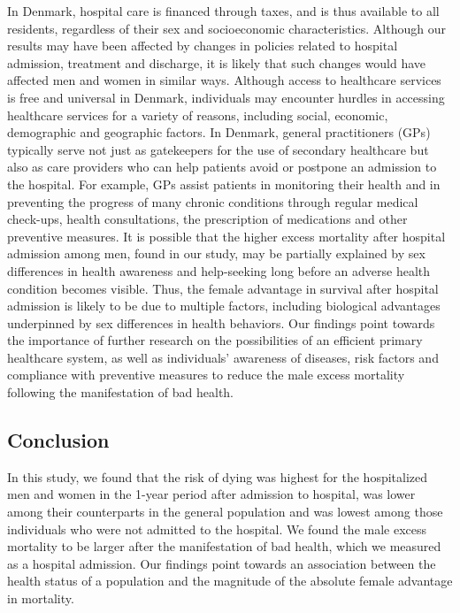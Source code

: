 In Denmark, hospital care is financed through taxes, and is thus available 
to all residents, regardless of their sex and socioeconomic characteristics.\citep{olesen2009delay} 
Although our results may have been affected by changes in policies related 
to hospital admission, treatment and discharge, it is likely that such 
changes would have affected men and women in similar ways. Although access 
to healthcare services is free and universal in Denmark, individuals may 
encounter hurdles in accessing healthcare services for a variety of reasons, 
including social, economic, demographic and geographic factors.\citep{starfield2012clinical} 
In Denmark, general practitioners (GPs) typically serve not just as 
gatekeepers for the use of secondary healthcare but also as care providers 
who can help patients avoid or postpone an admission to the hospital. For 
example, GPs assist patients in monitoring their health and in preventing 
the progress of many chronic conditions through regular medical check-ups, 
health consultations, the prescription of medications and other preventive 
measures.\citep{gervas2008clinical} It is possible that the higher excess 
mortality after hospital admission among men, found in our study, may be 
partially explained by sex differences in health awareness and help-seeking 
long before an adverse health condition becomes visible. Thus, the female 
advantage in survival after hospital admission is likely to be due to 
multiple factors, including biological advantages underpinned by sex differences 
in health behaviors. Our findings point towards the importance of further 
research on the possibilities of an efficient primary healthcare system, 
as well as individuals' awareness of diseases, risk factors and compliance 
with preventive measures to reduce the male excess mortality following the 
manifestation of bad health.\\

\subsection{Conclusion}
In this study, we found that the risk of dying was highest for the hospitalized 
men and women in the 1-year period after admission to hospital, was lower among 
their counterparts in the general population and was lowest among those 
individuals who were not admitted to the hospital. We found the male excess 
mortality to be larger after the manifestation of bad health, which we measured 
as a hospital admission. Our findings point towards an association between the 
health status of a population and the magnitude of the absolute female advantage 
in mortality.\\


